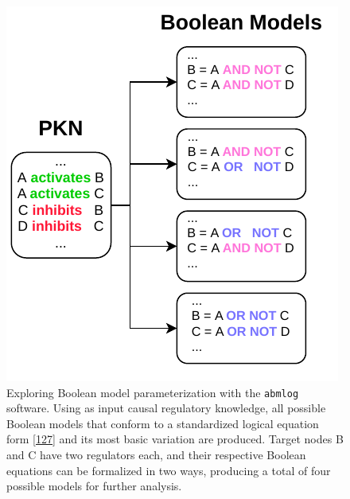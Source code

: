 \documentclass[
  12pt,
]{book}
\begin{document}
\begin{figure}
\centering
\includegraphics{img/abmlog_simple.pdf}
\caption{\label{fig:fig7}Exploring Boolean model parameterization with the \texttt{abmlog} software. Using as input causal regulatory knowledge, all possible Boolean models that conform to a standardized logical equation form {[}\protect\hyperlink{ref-Mendoza2006}{127}{]} and its most basic variation are produced. Target nodes B and C have two regulators each, and their respective Boolean equations can be formalized in two ways, producing a total of four possible models for further analysis.}
\end{figure}

\newpage
\end{document}
